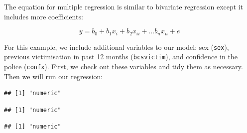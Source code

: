 \documentclass[
]{book}
\newenvironment{Shaded}{\begin{snugshade}}{\end{snugshade}}
\newcommand{\AttributeTok}[1]{\textcolor[rgb]{0.77,0.63,0.00}{#1}}
\newcommand{\CommentTok}[1]{\textcolor[rgb]{0.56,0.35,0.01}{\textit{#1}}}
\newcommand{\ConstantTok}[1]{\textcolor[rgb]{0.00,0.00,0.00}{#1}}
\newcommand{\FunctionTok}[1]{\textcolor[rgb]{0.00,0.00,0.00}{#1}}
\newcommand{\NormalTok}[1]{#1}
\newcommand{\OtherTok}[1]{\textcolor[rgb]{0.56,0.35,0.01}{#1}}
\newcommand{\SpecialCharTok}[1]{\textcolor[rgb]{0.00,0.00,0.00}{#1}}
\newcommand{\StringTok}[1]{\textcolor[rgb]{0.31,0.60,0.02}{#1}}
\begin{document}
The equation for multiple regression is similar to bivariate regression except it includes more coefficients:

\[y = b_0 + b_1x_i + b_2x_{ii} +... b_nx_n + e\]

For this example, we include additional variables to our model: sex (\texttt{sex}), previous victimisation in past 12 months (\texttt{bcsvictim}), and confidence in the police (\texttt{confx}). First, we check out these variables and tidy them as necessary. Then we will run our regression:

\begin{Shaded}
\end{Shaded}

\begin{verbatim}
## [1] "numeric"
\end{verbatim}

\begin{Shaded}
\end{Shaded}

\begin{verbatim}
## [1] "numeric"
\end{verbatim}

\begin{Shaded}
\end{Shaded}

\begin{verbatim}
## [1] "numeric"
\end{verbatim}
\end{document}

